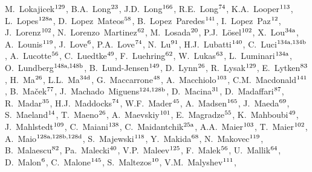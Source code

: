 \begin{flushleft}
M.~Lokajicek$^\textrm{\scriptsize 129}$,
B.A.~Long$^\textrm{\scriptsize 23}$,
J.D.~Long$^\textrm{\scriptsize 166}$,
R.E.~Long$^\textrm{\scriptsize 74}$,
K.A.~Looper$^\textrm{\scriptsize 113}$,
L.~Lopes$^\textrm{\scriptsize 128a}$,
D.~Lopez~Mateos$^\textrm{\scriptsize 58}$,
B.~Lopez~Paredes$^\textrm{\scriptsize 141}$,
I.~Lopez~Paz$^\textrm{\scriptsize 12}$,
J.~Lorenz$^\textrm{\scriptsize 102}$,
N.~Lorenzo~Martinez$^\textrm{\scriptsize 62}$,
M.~Losada$^\textrm{\scriptsize 20}$,
P.J.~L{\"o}sel$^\textrm{\scriptsize 102}$,
X.~Lou$^\textrm{\scriptsize 34a}$,
A.~Lounis$^\textrm{\scriptsize 119}$,
J.~Love$^\textrm{\scriptsize 6}$,
P.A.~Love$^\textrm{\scriptsize 74}$,
N.~Lu$^\textrm{\scriptsize 91}$,
H.J.~Lubatti$^\textrm{\scriptsize 140}$,
C.~Luci$^\textrm{\scriptsize 134a,134b}$,
A.~Lucotte$^\textrm{\scriptsize 56}$,
C.~Luedtke$^\textrm{\scriptsize 49}$,
F.~Luehring$^\textrm{\scriptsize 62}$,
W.~Lukas$^\textrm{\scriptsize 63}$,
L.~Luminari$^\textrm{\scriptsize 134a}$,
O.~Lundberg$^\textrm{\scriptsize 148a,148b}$,
B.~Lund-Jensen$^\textrm{\scriptsize 149}$,
D.~Lynn$^\textrm{\scriptsize 26}$,
R.~Lysak$^\textrm{\scriptsize 129}$,
E.~Lytken$^\textrm{\scriptsize 83}$,
H.~Ma$^\textrm{\scriptsize 26}$,
L.L.~Ma$^\textrm{\scriptsize 34d}$,
G.~Maccarrone$^\textrm{\scriptsize 48}$,
A.~Macchiolo$^\textrm{\scriptsize 103}$,
C.M.~Macdonald$^\textrm{\scriptsize 141}$,
B.~Ma\v{c}ek$^\textrm{\scriptsize 77}$,
J.~Machado~Miguens$^\textrm{\scriptsize 124,128b}$,
D.~Macina$^\textrm{\scriptsize 31}$,
D.~Madaffari$^\textrm{\scriptsize 87}$,
R.~Madar$^\textrm{\scriptsize 35}$,
H.J.~Maddocks$^\textrm{\scriptsize 74}$,
W.F.~Mader$^\textrm{\scriptsize 45}$,
A.~Madsen$^\textrm{\scriptsize 165}$,
J.~Maeda$^\textrm{\scriptsize 69}$,
S.~Maeland$^\textrm{\scriptsize 14}$,
T.~Maeno$^\textrm{\scriptsize 26}$,
A.~Maevskiy$^\textrm{\scriptsize 101}$,
E.~Magradze$^\textrm{\scriptsize 55}$,
K.~Mahboubi$^\textrm{\scriptsize 49}$,
J.~Mahlstedt$^\textrm{\scriptsize 109}$,
C.~Maiani$^\textrm{\scriptsize 138}$,
C.~Maidantchik$^\textrm{\scriptsize 25a}$,
A.A.~Maier$^\textrm{\scriptsize 103}$,
T.~Maier$^\textrm{\scriptsize 102}$,
A.~Maio$^\textrm{\scriptsize 128a,128b,128d}$,
S.~Majewski$^\textrm{\scriptsize 118}$,
Y.~Makida$^\textrm{\scriptsize 68}$,
N.~Makovec$^\textrm{\scriptsize 119}$,
B.~Malaescu$^\textrm{\scriptsize 82}$,
Pa.~Malecki$^\textrm{\scriptsize 40}$,
V.P.~Maleev$^\textrm{\scriptsize 125}$,
F.~Malek$^\textrm{\scriptsize 56}$,
U.~Mallik$^\textrm{\scriptsize 64}$,
D.~Malon$^\textrm{\scriptsize 6}$,
C.~Malone$^\textrm{\scriptsize 145}$,
S.~Maltezos$^\textrm{\scriptsize 10}$,
V.M.~Malyshev$^\textrm{\scriptsize 111}$,

\end{flushleft}
